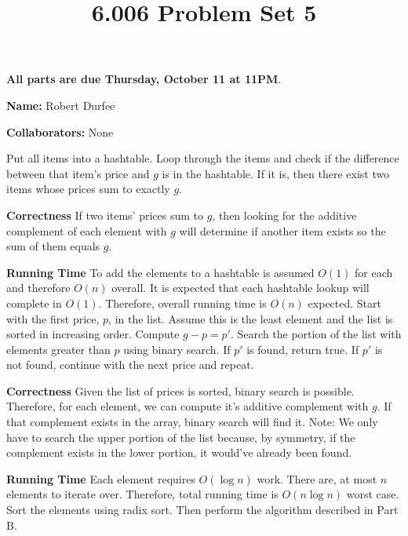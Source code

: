 \documentclass[12pt,twoside]{article}
\title{6.006 Problem Set 5}
\newcommand{\theproblemsetnum}{5}
\newcommand{\releasedate}{Thursday, October 4}
\newcommand{\partaduedate}{Thursday, October 11}
\begin{document}
\handout{Problem Set \theproblemsetnum}{\releasedate}
\textbf{All parts are due {\bf \partaduedate} at {\bf 11PM}}.

\setlength{\parindent}{0pt}
\medskip\hrulefill\medskip

{\bf Name:} Robert Durfee

\medskip

{\bf Collaborators:} None

\medskip\hrulefill

\begin{problems}

\problem  %

\begin{problemparts}
 Put all items into a hashtable. Loop through
    the items and check if the difference between that item's price and $g$
    is in the hashtable. If it is, then there exist two items whose prices
    sum to exactly $g$.
    
    {\bf Correctness} If two items' prices sum to $g$, then looking for the
    additive complement of each element with $g$ will determine if another
    item exists so the sum of them equals $g$.

    {\bf Running Time} To add the elements to a hashtable is assumed $O(1)$
    for each and therefore $O(n)$ overall. It is expected that each hashtable
    lookup will complete in $O(1)$. Therefore, overall running time is $O(n)$
    expected.
 Start with the first price, $p$, in the list.
    Assume this is the least element and the list is sorted in increasing order.
    Compute $ g - p = p' $. Search the portion of the list with elements
    greater than $p$ using binary search. If $p'$ is found, return true. If
    $p'$ is not found, continue with the next price and repeat.

    {\bf Correctness} Given the list of prices is sorted, binary search is
    possible. Therefore, for each element, we can compute it's additive
    complement with $g$. If that complement exists in the array, binary
    search will find it. Note: We only have to search the upper portion of
    the list because, by symmetry, if the complement exists in the lower
    portion, it would've already been found.

    {\bf Running Time} Each element requires $O(\log n)$ work. There are, at
    most $n$ elements to iterate over. Therefore, total running time is $O(n
    \log n)$ worst case.
 Sort the elements using radix sort. Then
    perform the algorithm described in Part B.


\end{problemparts}
\end{problems}
\end{document}
